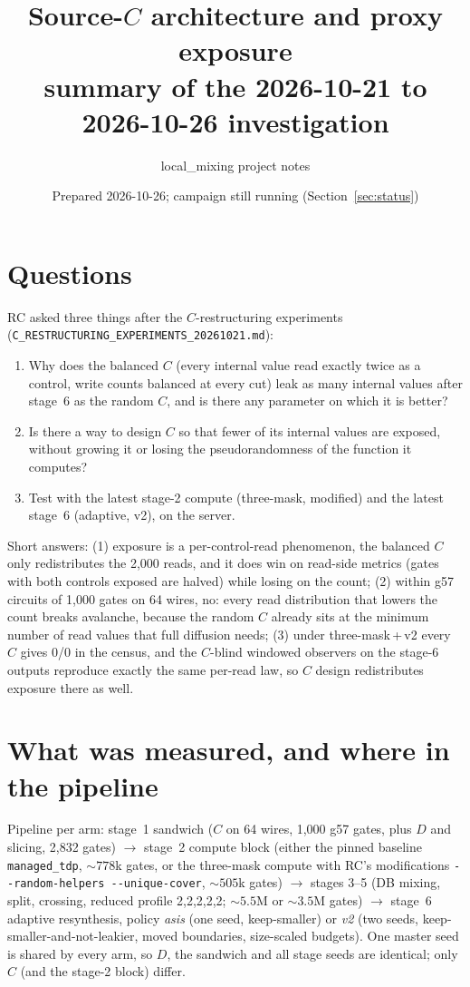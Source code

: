 \documentclass[11pt]{article}
\title{Source-\texorpdfstring{$C$}{C} architecture and proxy exposure\\[2pt] \large summary of the 2026-10-21 to 2026-10-26 investigation}
\author{local\_mixing project notes}
\date{Prepared 2026-10-26; campaign still running (Section~\ref{sec:status})}
\newcommand{\code}[1]{\texttt{#1}}
\begin{document}
\maketitle

\section{Questions}
RC asked three things after the $C$-restructuring experiments (\code{C\_RESTRUCTURING\_EXPERIMENTS\_20261021.md}):
\begin{enumerate}
\item Why does the balanced $C$ (every internal value read exactly twice as a control, write counts balanced at every cut) leak as many internal values after stage~6 as the random $C$, and is there any parameter on which it is better?
\item Is there a way to design $C$ so that fewer of its internal values are exposed, without growing it or losing the pseudorandomness of the function it computes?
\item Test with the latest stage-2 compute (three-mask, modified) and the latest stage~6 (adaptive, v2), on the server.
\end{enumerate}
Short answers: (1) exposure is a per-control-read phenomenon, the balanced $C$ only redistributes the 2,000 reads, and it does win on read-side metrics (gates with both controls exposed are halved) while losing on the count; (2) within g57 circuits of 1,000 gates on 64 wires, no: every read distribution that lowers the count breaks avalanche, because the random $C$ already sits at the minimum number of read values that full diffusion needs; (3) under three-mask\,+\,v2 every $C$ gives 0/0 in the census, and the $C$-blind windowed observers on the stage-6 outputs reproduce exactly the same per-read law, so $C$ design redistributes exposure there as well.

\section{What was measured, and where in the pipeline}
Pipeline per arm: stage~1 sandwich ($C$ on 64 wires, 1,000 g57 gates, plus $D$ and slicing, 2,832 gates) $\to$ stage~2 compute block (either the pinned baseline \code{managed\_tdp}, ${\sim}778$k gates, or the three-mask compute with RC's modifications \code{-{}-random-helpers -{}-unique-cover}, ${\sim}505$k gates) $\to$ stages 3--5 (DB mixing, split, crossing, reduced profile 2,2,2,2,2; ${\sim}5.5$M or ${\sim}3.5$M gates) $\to$ stage~6 adaptive resynthesis, policy \emph{asis} (one seed, keep-smaller) or \emph{v2} (two seeds, keep-smaller-and-not-leakier, moved boundaries, size-scaled budgets). One master seed is shared by every arm, so $D$, the sandwich and all stage seeds are identical; only $C$ (and the stage-2 block) differ.
\end{document}
